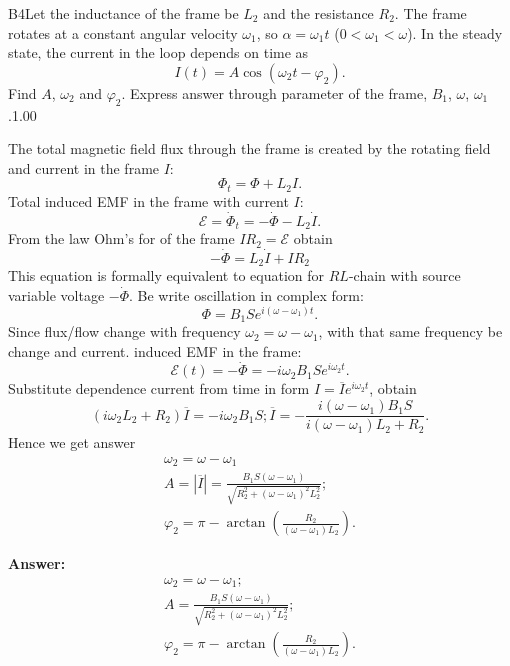 \documentclass[11pt,a4paper]{article}
\begin{document}
\begin{solcard}{B4}{Let the inductance of the frame be $L_2$ and the resistance $R_2$. The frame rotates at a constant angular velocity $\omega_1$, so $\alpha = \omega_1 t$ ($0<\omega_1 < \omega$). In the steady state, the current in the loop depends on time as $$ I(t) = A \cos \left( \omega_2 t  - \varphi_2\right). $$ Find $A$, $\omega_2$ and $\varphi_2$. Express answer through parameter of the frame, $B_1$, $\omega$, $\omega_1$.}{1.00}

The total magnetic field flux through the frame is created by the rotating field and current in the frame $I$: $$\Phi_t = \Phi + L_2 I.$$ Total induced EMF in the frame with current $I$: $$ \mathcal{E}= \dot{\Phi}_t = -\dot{\Phi}-L_2\dot{I}. $$ From the law Ohm's for of the frame $I R_2 = \mathcal{E}$ obtain $$ -\dot{\Phi} = L_2\dot{I}+IR_2 $$ This equation is formally equivalent to equation for $RL$-chain with source variable voltage $- \dot{\Phi}$. Be write oscillation in complex form: $$ \Phi = B_1Se^{i (\omega - \omega_1) t}. $$ Since flux/flow change with frequency $\omega_2 = \omega - \omega_1$, with that same frequency be change and current. induced EMF in the frame: $$ \mathcal{E} (t)= -\dot {\Phi} =- i \omega_2B_1Se^{i \omega_2 t}. $$ Substitute dependence current from time in form $I = \overline{I} e^{i \omega_2 t}$, obtain $$ (i \omega_2 L_2 + R_2) \overline{I} = - i \omega_2 B_1 S;  \overline{I} = -\frac{i(\omega - \omega_1)B_1S}{i(\omega - \omega_1)L_2 + R_2}. $$ Hence we get answer $$\begin{aligned} \omega_2 = \omega - \omega_1 \\
 A = |\overline{I}| = \frac{B_1S(\omega - \omega_1)}{\sqrt{R_2^2 + (\omega - \omega_1)^2L_2^2}} ; \\
 \varphi_2 =\pi- \arctan\left(\frac{R_2}{(\omega - \omega_1) L_2}\right). \end{aligned}$$

\par\smallskip\noindent\textbf{Answer:} $$\begin{aligned} \omega_2 = \omega - \omega_1; \\
 A = \frac{B_1S(\omega - \omega_1)}{\sqrt{R_2^2 + (\omega - \omega_1)^2L_2^2}}; \\
 \varphi_2 =\pi - \arctan\left(\frac{R_2}{(\omega - \omega_1) L_2}\right). \end{aligned}$$
\end{solcard}
\end{document}
